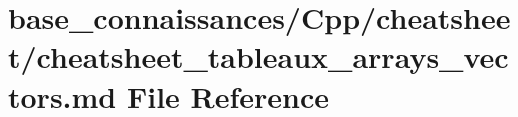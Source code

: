 \hypertarget{base__connaissances_2Cpp_2cheatsheet_2cheatsheet__tableaux__arrays__vectors_8md}{}\section{base\+\_\+connaissances/\+Cpp/cheatsheet/cheatsheet\+\_\+tableaux\+\_\+arrays\+\_\+vectors.md File Reference}
\label{base__connaissances_2Cpp_2cheatsheet_2cheatsheet__tableaux__arrays__vectors_8md}
